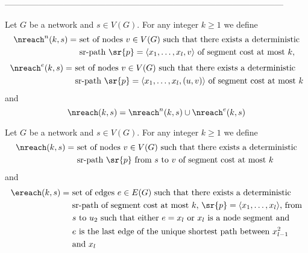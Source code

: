 
---------------------------------------------------------------------------------------------------

\begin{definition}
Let $G$ be a network and $s \in V(G)$. For any integer $k \geq 1$ we define
\begin{align*}
\nreach^n(k, s) = & \ \textrm{set of nodes $v \in V(G)$ such that there exists a deterministic} \\ 
                & \ \textrm{sr-path $\sr{p} = \langle x_1, \ldots, x_l, v \rangle$ of segment cost at most $k$},
\end{align*}
\begin{align*}
\nreach^e(k, s) = & \ \textrm{set of nodes $v \in V(G)$ such that there exists a deterministic} \\ 
                  & \ \textrm{sr-path $\sr{p} = \langle x_1, \ldots, x_l, (u, v) \rangle$ of segment cost at most $k$}
\end{align*}
and
$$
\nreach(k, s) = \nreach^n(k, s) \cup \nreach^e(k, s)
$$
\end{definition}

\begin{definition}
Let $G$ be a network and $s \in V(G)$. For any integer $k \geq 1$ we define
\begin{align*}
\nreach(k, s) = & \ \textrm{set of nodes $v \in V(G)$ such that there exists a deterministic} \\ 
                & \ \textrm{sr-path $\sr{p}$ from $s$ to $v$ of segment cost at most $k$}
\end{align*}
and
\begin{align*}
\ereach(k, s) = & \ \textrm{set of edges $e \in E(G)$ such that there exists a deterministic} \\ 
                & \ \textrm{sr-path of segment cost at most $k$, $\sr{p} = \langle x_1, \ldots, x_l \rangle$, from} \\
                & \ \textrm{$s$ to $u_2$ such that either $e = x_l$ or $x_l$ is a node segment and} \\
                & \ \textrm{$e$ is the last edge of the unique shortest path between $x^2_{l - 1}$} \\
                & \ \textrm{and $x_l$}
\end{align*}
\end{definition}

